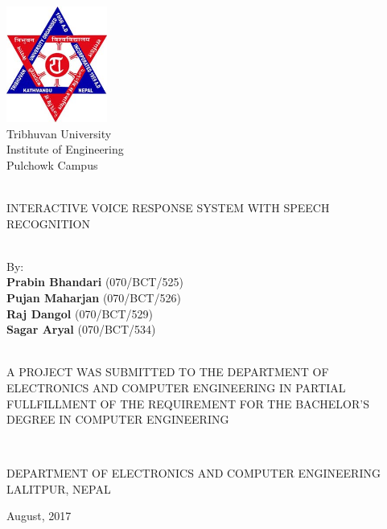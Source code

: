 


\begin{titlepage}
  \centering
  \large

  \includegraphics[height=1.5in]{images/tu}\\
  {\Large\sc Tribhuvan University}\\
  {\Large\sc Institute of Engineering}\\
  {\Large\sc Pulchowk Campus}\\

  ~

  
  {\Huge\sc INTERACTIVE VOICE RESPONSE SYSTEM WITH SPEECH RECOGNITION}\\

  ~


  By:\\
  {\bf Prabin Bhandari} (070/BCT/525)\\
  {\bf Pujan Maharjan} (070/BCT/526)\\
  {\bf Raj Dangol} (070/BCT/529)\\
  {\bf Sagar Aryal} (070/BCT/534)\\

  ~

  \normalsize
  A PROJECT WAS SUBMITTED TO THE DEPARTMENT OF ELECTRONICS AND COMPUTER
  ENGINEERING IN PARTIAL FULLFILLMENT OF THE REQUIREMENT FOR THE BACHELOR'S
  DEGREE IN COMPUTER ENGINEERING
  ~

  ~
  
  DEPARTMENT OF ELECTRONICS AND COMPUTER ENGINEERING\\
  LALITPUR, NEPAL

  \vfill
  August, 2017

\end{titlepage}
